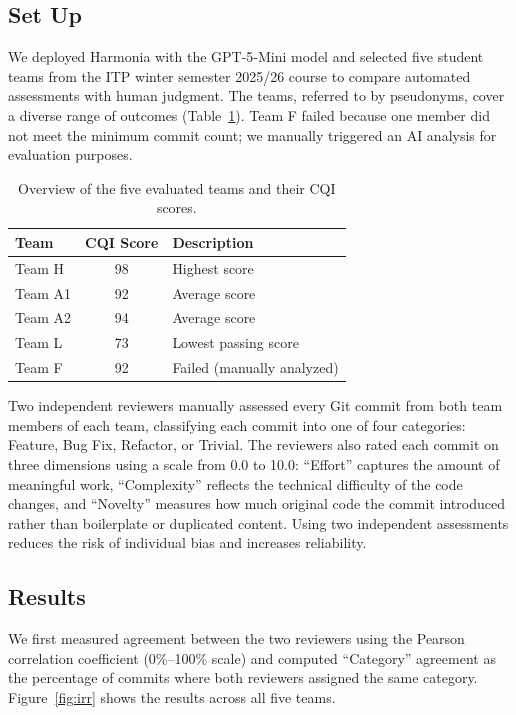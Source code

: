 \documentclass[sigconf]{acmart}
\begin{document}
\subsection{Set Up}
We deployed Harmonia with the GPT-5-Mini model and selected five student teams from the ITP winter semester 2025/26 course to compare automated assessments with human judgment. The teams, referred to by pseudonyms, cover a diverse range of outcomes (Table~\ref{tbl:teams}). Team F failed because one member did not meet the minimum commit count; we manually triggered an AI analysis for evaluation purposes.

\begin{table}
  \caption{Overview of the five evaluated teams and their CQI scores.}
  \label{tbl:teams}
  \begin{tabular}{lcl}
    \toprule
    \textbf{Team} & \textbf{CQI Score} & \textbf{Description} \\
    \midrule
    Team H & 98 & Highest score \\
    Team A1 & 92 & Average score \\
    Team A2 & 94 & Average score \\
    Team L & 73 & Lowest passing score \\
    Team F & 92 & Failed (manually analyzed) \\
    \bottomrule
  \end{tabular}
\end{table}

Two independent reviewers manually assessed every Git commit from both team members of each team, classifying each commit into one of four categories: Feature, Bug Fix, Refactor, or Trivial. The reviewers also rated each commit on three dimensions using a scale from 0.0 to 10.0: ``Effort'' captures the amount of meaningful work, ``Complexity'' reflects the technical difficulty of the code changes, and ``Novelty'' measures how much original code the commit introduced rather than boilerplate or duplicated content. Using two independent assessments reduces the risk of individual bias and increases reliability.

\subsection{Results}
We first measured agreement between the two reviewers using the Pearson correlation coefficient (0\%--100\% scale) and computed ``Category'' agreement as the percentage of commits where both reviewers assigned the same category. Figure~\ref{fig:irr} shows the results across all five teams.
\end{document}
